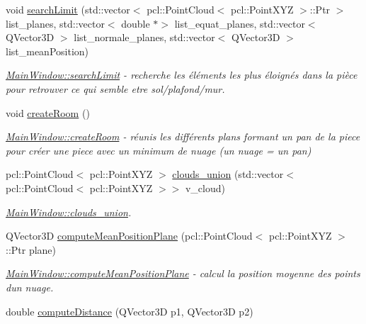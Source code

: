 \begin{DoxyCompactItemize}
void \hyperlink{classMainWindow_a884e9d60c68bb38b4830a36907a59c79}{search\+Limit} (std\+::vector$<$ pcl\+::\+Point\+Cloud$<$ pcl\+::\+Point\+X\+YZ $>$\+::Ptr $>$ list\+\_\+planes, std\+::vector$<$ double $\ast$$>$ list\+\_\+equat\+\_\+planes, std\+::vector$<$ Q\+Vector3D $>$ list\+\_\+normale\+\_\+planes, std\+::vector$<$ Q\+Vector3D $>$ list\+\_\+mean\+Position)
\begin{DoxyCompactList}\small\item\em \hyperlink{classMainWindow_a884e9d60c68bb38b4830a36907a59c79}{Main\+Window\+::search\+Limit} -\/ recherche les éléments les plus éloignés dans la pièce pour retrouver ce qui semble etre sol/plafond/mur. \end{DoxyCompactList}\item 
\mbox{\label{classMainWindow_a751785ea3a2a4405d8479ca979ff6061}} 
void \hyperlink{classMainWindow_a751785ea3a2a4405d8479ca979ff6061}{create\+Room} ()
\begin{DoxyCompactList}\small\item\em \hyperlink{classMainWindow_a751785ea3a2a4405d8479ca979ff6061}{Main\+Window\+::create\+Room} -\/ réunis les différents plans formant un pan de la piece pour créer une piece avec un minimum de nuage (un nuage = un pan) \end{DoxyCompactList}\item 
pcl\+::\+Point\+Cloud$<$ pcl\+::\+Point\+X\+YZ $>$ \hyperlink{classMainWindow_a419bc39129027cc42b708751088cbde7}{clouds\+\_\+union} (std\+::vector$<$ pcl\+::\+Point\+Cloud$<$ pcl\+::\+Point\+X\+YZ $>$$>$ v\+\_\+cloud)
\begin{DoxyCompactList}\small\item\em \hyperlink{classMainWindow_a419bc39129027cc42b708751088cbde7}{Main\+Window\+::clouds\+\_\+union}. \end{DoxyCompactList}\item 
Q\+Vector3D \hyperlink{classMainWindow_a4cc8d1511438ac06d0e6c663c7fa3ab7}{compute\+Mean\+Position\+Plane} (pcl\+::\+Point\+Cloud$<$ pcl\+::\+Point\+X\+YZ $>$\+::Ptr plane)
\begin{DoxyCompactList}\small\item\em \hyperlink{classMainWindow_a4cc8d1511438ac06d0e6c663c7fa3ab7}{Main\+Window\+::compute\+Mean\+Position\+Plane} -\/ calcul la position moyenne des points d\textquotesingle{}un nuage. \end{DoxyCompactList}\item 
double \hyperlink{classMainWindow_a5cf7c81626d682f087f5143605342f52}{compute\+Distance} (Q\+Vector3D p1, Q\+Vector3D p2)

\end{DoxyCompactItemize}
